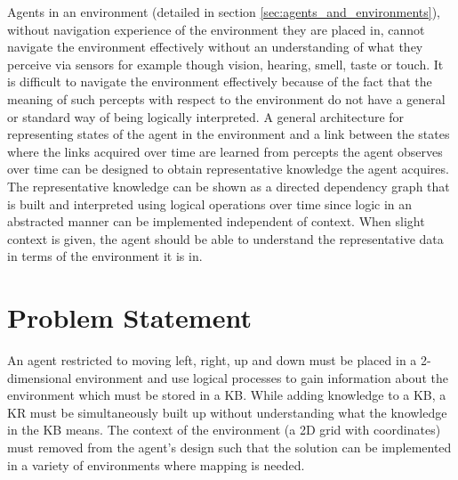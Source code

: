 Agents in an environment (detailed in section \ref{sec:agents_and_environments}), without navigation experience of the environment they are placed in, cannot navigate the environment effectively without an understanding of what they perceive via sensors for example though vision, hearing, smell, taste or touch.
It is difficult to navigate the environment effectively because of the fact that the meaning of such percepts with respect to the environment do not have a general or standard way of being logically interpreted. 
A general architecture for representing states of the agent in the environment and a link between the states where the links acquired over time are learned from percepts the agent observes over time can be designed to obtain representative knowledge the agent acquires. 
The representative knowledge can be shown as a directed dependency graph that is built and interpreted using logical operations over time since logic in an abstracted manner can be implemented independent of context. When slight context is given, the agent should be able to understand the representative data in terms of the environment it is in.

\section{Problem Statement}
An agent restricted to moving left, right, up and down must be placed in a 2-dimensional environment and use logical processes to gain information about the environment which must be stored in a KB. While adding knowledge to a KB, a KR must be simultaneously built up without understanding what the knowledge in the KB means. The context of the environment (a 2D grid with coordinates) must removed from the agent's design such that the solution can be implemented in a variety of environments where mapping is needed.  

